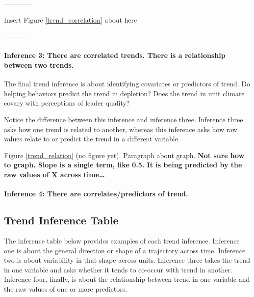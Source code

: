 \documentclass[english,,man]{apa6}
\let\oldparagraph\paragraph
\renewcommand{\paragraph}[1]{\oldparagraph{#1}\mbox{}}
\theoremstyle{definition}
\theoremstyle{definition}
\theoremstyle{definition}
\theoremstyle{remark}
\begin{document}
\begin{center}

------------

Insert Figure \ref{trend_correlation} about here

------------

\end{center}

\hypertarget{inference-3-there-are-correlated-trends.-there-is-a-relationship-between-two-trends.}{%
\paragraph{Inference 3: There are correlated trends. There is a
relationship between two
trends.}\label{inference-3-there-are-correlated-trends.-there-is-a-relationship-between-two-trends.}}

The final trend inference is about identifying covariates or predictors
of trend. Do helping behaviors predict the trend in depletion? Does the
trend in unit climate covary with perceptions of leader quality?

Notice the difference between this inference and inference three.
Inference three asks how one trend is related to another, whereas this
inference asks how raw values relate to or predict the trend in a
different variable.

Figure \ref{trend_relation} (no figure yet). Paragraph about graph.
\textbf{Not sure how to graph. Slope is a single term, like 0.5. It is
being predicted by the raw values of X across time\ldots{}}

\hypertarget{inference-4-there-are-correlatespredictors-of-trend.}{%
\paragraph{Inference 4: There are correlates/predictors of
trend.}\label{inference-4-there-are-correlatespredictors-of-trend.}}

\hypertarget{trend-inference-table}{%
\subsection{Trend Inference Table}\label{trend-inference-table}}

The inference table below provides examples of each trend inference.
Inference one is about the general direction or shape of a trajectory
across time. Inference two is about variability in that shape across
units. Inference three takes the trend in one variable and asks whether
it tends to co-occur with trend in another. Inference four, finally, is
about the relationship between trend in one variable and the raw values
of one or more predictors.
\end{document}
